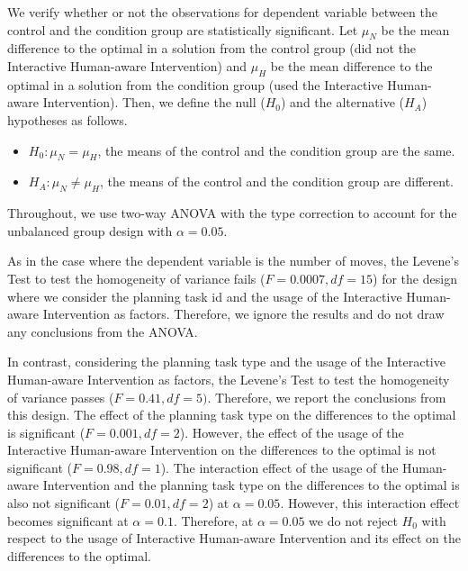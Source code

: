We verify whether or not the observations for dependent variable between the control and the condition group are statistically significant.
Let $\mu_N$ be the mean difference to the optimal in a solution from the control group (did not the Interactive Human-aware Intervention) and $\mu_H$ be the mean difference to the optimal in a solution from the condition group (used the Interactive Human-aware Intervention).
Then, we define the null ($H_0$) and the alternative ($H_A$) hypotheses as follows.
\begin{itemize}
\item $H_0: \mu_N = \mu_H$, the means of the control and the condition group are the same.
\item $H_A: \mu_N \neq \mu_H$, the means of the control and the condition group are different.
\end{itemize}
Throughout, we use two-way ANOVA with the type  correction to account for the unbalanced group design with $\alpha=0.05$.

As in the case where the dependent variable is the number of moves, the Levene's Test to test the homogeneity of variance fails ($F=0.0007, df=15$) for the design where we consider the planning task id and the usage of the Interactive Human-aware Intervention as factors.
Therefore, we ignore the results and do not draw any conclusions from the ANOVA.

In contrast, considering the planning task type and the usage of the Interactive Human-aware Intervention as factors, the Levene's Test to test the homogeneity of variance passes ($F=0.41, df=5)$.
Therefore, we report the conclusions from this design.
The effect of the planning task type on the differences to the optimal is significant ($F=0.001, df=2$).
However, the effect of the usage of the Interactive Human-aware Intervention on the differences to the optimal is not significant ($F=0.98, df=1$).
The interaction effect of the usage of the Human-aware Intervention and the planning task type on the differences to the optimal is also not significant ($F=0.01, df=2$) at $\alpha=0.05$.
However, this interaction effect becomes significant at $\alpha=0.1$.
Therefore, at $\alpha=0.05$ we do not reject $H_0$ with respect to the usage of Interactive Human-aware Intervention and its effect on the differences to the optimal.



